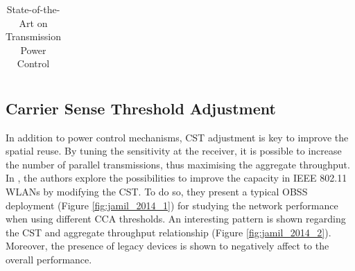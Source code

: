 \documentclass[12pt, a4paper,twoside]{tesi_upf}
\begin{document}
\begin{table}[t!]
{\begin{tabular}{|c|l|c|l|l|}
					\end{tabular}}
					\caption{State-of-the-Art on Transmission Power Control}
					\label{tbl:tpc}
				\end{table}									
							
		\subsection{Carrier Sense Threshold Adjustment}
		\label{section:cca}
			In addition to power control mechanisms, CST adjustment is key to improve the spatial reuse. By tuning the sensitivity at the receiver, it is possible to increase the number of parallel transmissions, thus maximising the aggregate throughput. In \cite{jamil2014improving}, the authors explore the possibilities to improve the capacity in IEEE 802.11 WLANs by modifying the CST. To do so, they present a typical OBSS deployment (Figure \ref{fig:jamil_2014_1}) for studying the network performance when using different CCA thresholds. An interesting pattern is shown regarding the CST and aggregate throughput relationship (Figure \ref{fig:jamil_2014_2}). Moreover, the presence of legacy devices is shown to negatively affect to the overall performance.
\end{document}
